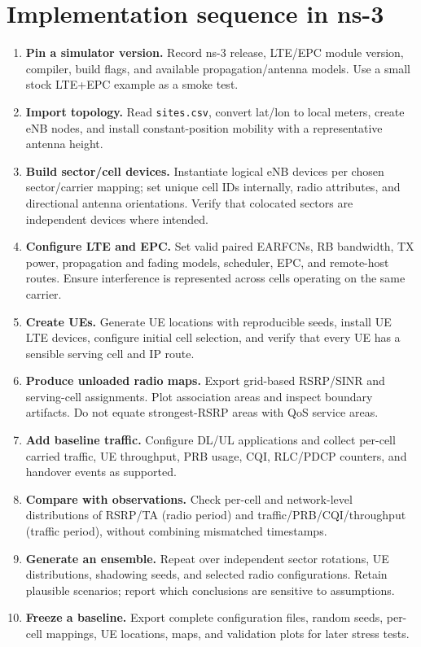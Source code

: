 \documentclass[11pt,a4paper]{article}
\begin{document}
\section{Implementation sequence in ns-3}
\begin{enumerate}[leftmargin=*,itemsep=3pt]
\item \textbf{Pin a simulator version.} Record ns-3 release, LTE/EPC module version, compiler, build flags, and available propagation/antenna models. Use a small stock LTE+EPC example as a smoke test.
\item \textbf{Import topology.} Read \texttt{sites.csv}, convert lat/lon to local meters, create eNB nodes, and install constant-position mobility with a representative antenna height.
\item \textbf{Build sector/cell devices.} Instantiate logical eNB devices per chosen sector/carrier mapping; set unique cell IDs internally, radio attributes, and directional antenna orientations. Verify that colocated sectors are independent devices where intended.
\item \textbf{Configure LTE and EPC.} Set valid paired EARFCNs, RB bandwidth, TX power, propagation and fading models, scheduler, EPC, and remote-host routes. Ensure interference is represented across cells operating on the same carrier.
\item \textbf{Create UEs.} Generate UE locations with reproducible seeds, install UE LTE devices, configure initial cell selection, and verify that every UE has a sensible serving cell and IP route.
\item \textbf{Produce unloaded radio maps.} Export grid-based RSRP/SINR and serving-cell assignments. Plot association areas and inspect boundary artifacts. Do not equate strongest-RSRP areas with QoS service areas.
\item \textbf{Add baseline traffic.} Configure DL/UL applications and collect per-cell carried traffic, UE throughput, PRB usage, CQI, RLC/PDCP counters, and handover events as supported.
\item \textbf{Compare with observations.} Check per-cell and network-level distributions of RSRP/TA (radio period) and traffic/PRB/CQI/throughput (traffic period), without combining mismatched timestamps.
\item \textbf{Generate an ensemble.} Repeat over independent sector rotations, UE distributions, shadowing seeds, and selected radio configurations. Retain plausible scenarios; report which conclusions are sensitive to assumptions.
\item \textbf{Freeze a baseline.} Export complete configuration files, random seeds, per-cell mappings, UE locations, maps, and validation plots for later stress tests.
\end{enumerate}
\end{document}
